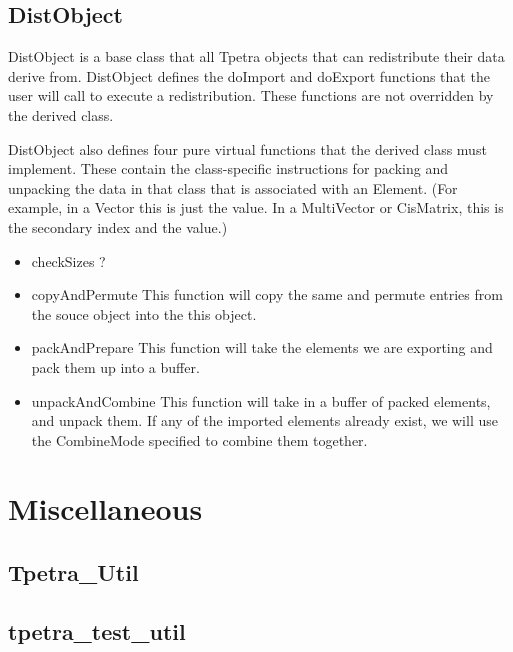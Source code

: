\documentclass[10pt,relax]{TpetraDesign}
\begin{document}
\subsection{DistObject}

DistObject is a base class that all Tpetra objects that can redistribute their data derive from. DistObject defines the doImport and doExport functions that the user will call to execute a redistribution. These functions are not overridden by the derived class. 

DistObject also defines four pure virtual functions that the derived class must implement. These contain the class-specific instructions for packing and unpacking the data in that class that is associated with an Element. (For example, in a Vector this is just the value. In a MultiVector or CisMatrix, this is the secondary index and the value.)
\begin{itemize}
\item checkSizes ?
\item copyAndPermute This function will copy the same and permute entries from the souce object into the this object.
\item packAndPrepare This function will take the elements we are exporting and pack them up into a buffer.
\item unpackAndCombine This function will take in a buffer of packed elements, and unpack them. If any of the imported elements already exist, we will use the CombineMode specified to combine them together.
\end{itemize}

%
\section{Miscellaneous}

\subsection{Tpetra\_Util}
\subsection{tpetra\_test\_util}

%
\clearpage


\end{document}
